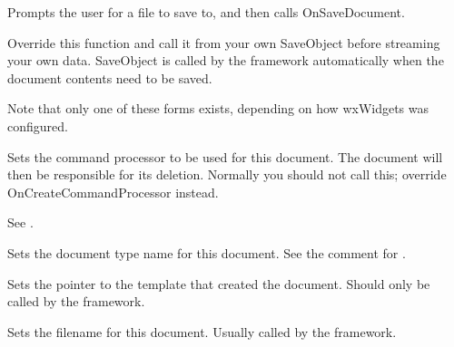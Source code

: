 \label{wxdocumentsaveas}


Prompts the user for a file to save to, and then calls OnSaveDocument.

\label{wxdocumentsaveobject}



Override this function and call it from your own SaveObject before
streaming your own data. SaveObject is called by the framework
automatically when the document contents need to be saved.

Note that only one of these forms exists, depending on how wxWidgets
was configured.

\label{wxdocumentsetcommandprocessor}


Sets the command processor to be used for this document. The document will then be responsible
for its deletion. Normally you should not call this; override OnCreateCommandProcessor
instead.

See .

\label{wxdocumentsetdocumentname}


Sets the document type name for this document. See the comment for .

\label{wxdocumentsetdocumenttemplate}


Sets the pointer to the template that created the document. Should only be called by the
framework.

\label{wxdocumentsetfilename}


Sets the filename for this document. Usually called by the framework.

